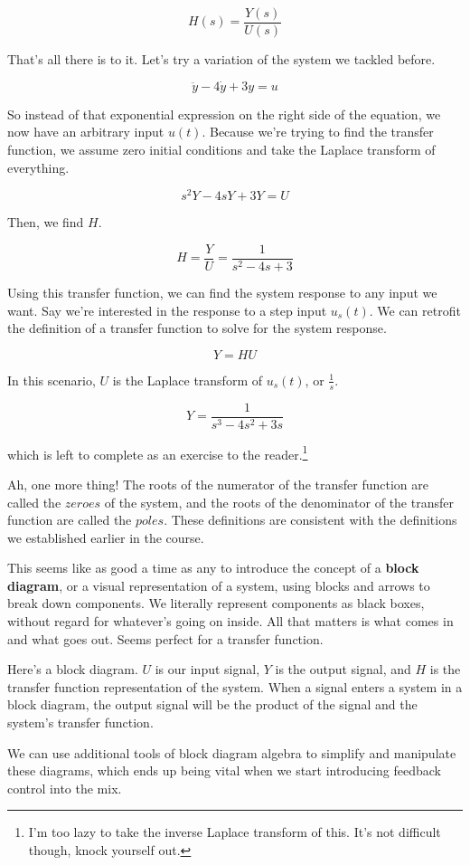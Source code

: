 \documentclass[
  letterpaper,
  DIV=11,
  numbers=noendperiod]{scrreprt}
\begin{document}
\[H(s) = \frac{Y(s)}{U(s)}\]

That's all there is to it. Let's try a variation of the system we
tackled before.

\[\ddot{y} - 4 \dot{y} + 3y = u\]

So instead of that exponential expression on the right side of the
equation, we now have an arbitrary input \(u(t)\). Because we're trying
to find the transfer function, we assume zero initial conditions and
take the Laplace transform of everything.

\[s^2 Y - 4 s Y + 3Y = U\]

Then, we find \(H\).

\[H = \frac{Y}{U} = \frac{1}{s^2 - 4s + 3}\]

Using this transfer function, we can find the system response to any
input we want. Say we're interested in the response to a step input
\(u_s(t)\). We can retrofit the definition of a transfer function to
solve for the system response.

\[Y = H U\]

In this scenario, \(U\) is the Laplace transform of \(u_s(t)\), or
\(\frac{1}{s}\).

\[Y = \frac{1}{s^3 - 4s^2 + 3s}\]

which is left to complete as an exercise to the reader.\footnote{I'm too
  lazy to take the inverse Laplace transform of this. It's not difficult
  though, knock yourself out.}

Ah, one more thing! The roots of the numerator of the transfer function
are called the \(zeroes\) of the system, and the roots of the
denominator of the transfer function are called the \(poles\). These
definitions are consistent with the definitions we established earlier
in the course.

This seems like as good a time as any to introduce the concept of a
\textbf{block diagram}, or a visual representation of a system, using
blocks and arrows to break down components. We literally represent
components as black boxes, without regard for whatever's going on
inside. All that matters is what comes in and what goes out. Seems
perfect for a transfer function.

Here's a block diagram. \(U\) is our input signal, \(Y\) is the output
signal, and \(H\) is the transfer function representation of the system.
When a signal enters a system in a block diagram, the output signal will
be the product of the signal and the system's transfer function.

We can use additional tools of block diagram algebra to simplify and
manipulate these diagrams, which ends up being vital when we start
introducing feedback control into the mix.
\end{document}
